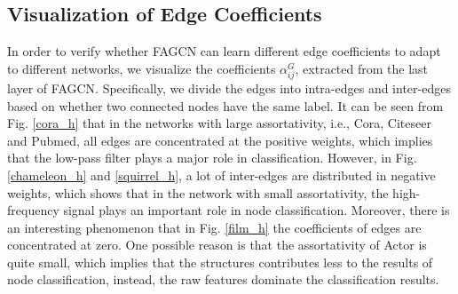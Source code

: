 \documentclass[letterpaper]{article} %
\begin{document}


\subsection{Visualization of Edge Coefficients}
\label{visualexperiment}

In order to verify whether FAGCN can learn different edge coefficients to adapt to different networks, we visualize the coefficients $\alpha_{ij}^{G}$, extracted from the last layer of FAGCN.
Specifically, we divide the edges into intra-edges and inter-edges based on whether two connected nodes have the same label. 
It can be seen from Fig. \ref{cora_h} that in the networks with large assortativity, i.e., Cora, Citeseer and Pubmed, all edges are concentrated at the positive weights, which implies that the low-pass filter plays a major role in classification.
However, in Fig. \ref{chameleon_h} and \ref{squirrel_h}, a lot of inter-edges are distributed in negative weights, which shows that in the network with small assortativity, the high-frequency signal plays an important role in node classification.
Moreover, there is an interesting phenomenon that in Fig. \ref{film_h} the coefficients of edges are concentrated at zero. One possible reason is that the assortativity of Actor is quite small, which implies that the structures contributes less to the results of node classification, instead, the raw features dominate the classification results.
\end{document}
